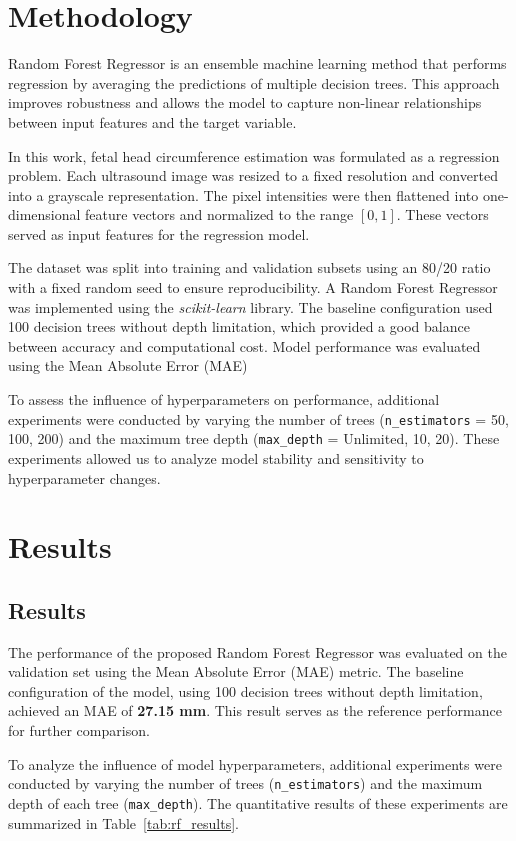 \documentclass{IEEEtran}
\begin{document}
\section{Methodology}
Random Forest Regressor is an ensemble machine learning method that performs regression by averaging the predictions of multiple decision trees. This approach improves robustness and allows the model to capture non-linear relationships between input features and the target variable.

In this work, fetal head circumference estimation was formulated as a regression problem. Each ultrasound image was resized to a fixed resolution and converted into a grayscale representation. The pixel intensities were then flattened into one-dimensional feature vectors and normalized to the range $[0,1]$. These vectors served as input features for the regression model.

The dataset was split into training and validation subsets using an 80/20 ratio with a fixed random seed to ensure reproducibility. A Random Forest Regressor was implemented using the \textit{scikit-learn} library. The baseline configuration used 100 decision trees without depth limitation, which provided a good balance between accuracy and computational cost. Model performance was evaluated using the Mean Absolute Error (MAE)

To assess the influence of hyperparameters on performance, additional experiments were conducted by varying the number of trees (\texttt{n\_estimators} = 50, 100, 200) and the maximum tree depth (\texttt{max\_depth} = Unlimited, 10, 20). These experiments allowed us to analyze model stability and sensitivity to hyperparameter changes.
\section{Results}

\subsection{ Results}

The performance of the proposed Random Forest Regressor was evaluated on the validation set using the Mean Absolute Error (MAE) metric. The baseline configuration of the model, using 100 decision trees without depth limitation, achieved an MAE of \textbf{27.15 mm}. This result serves as the reference performance for further comparison.

To analyze the influence of model hyperparameters, additional experiments were conducted by varying the number of trees (\texttt{n\_estimators}) and the maximum depth of each tree (\texttt{max\_depth}). The quantitative results of these experiments are summarized in Table~\ref{tab:rf_results}.
\end{document}
